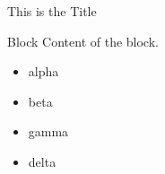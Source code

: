 \documentclass{beamer}
\begin{document}
\begin{frame}{This is the Title}
	\begin{block}{Block}
		Content of the block.
	\end{block}
	\begin{itemize}
		\item alpha
		\item beta
		\item gamma
		\item delta
	\end{itemize}
\end{frame}
\end{document}
